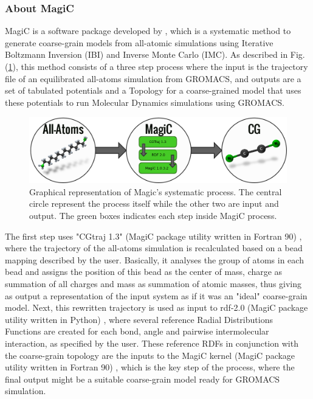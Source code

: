 \documentclass[10pt,a4paper,twoside]{article}
\begin{document}
\subsubsection{About MagiC}
\label{subsubsec:magic}
MagiC is a software package developed by , which is a systematic method to generate coarse-grain models from all-atomic simulations using Iterative Boltzmann Inversion (IBI) and Inverse Monte Carlo (IMC). As described in Fig.(\ref{Fig:magic}), this method consists of a three step process where the input is the trajectory file of an equilibrated all-atoms simulation from GROMACS, and outputs are a set of tabulated potentials and a Topology for a coarse-grained model that uses these potentials to run Molecular Dynamics simulations using GROMACS. 
 \begin{figure}[ht]
  \begin{center}
	\includegraphics[width=1 \textwidth]{./images/magic}
	\caption{Graphical representation of Magic's systematic process. The central circle represent the process itself while the other two are input and output. The green boxes indicates each step inside MagiC process. }
	\label{Fig:magic}
	\end{center}
	\end{figure}

 The first step uses "CGtraj 1.3" (MagiC package utility written in Fortran 90) \cite{magicmanu}, where the trajectory of the all-atoms simulation is recalculated based on a bead mapping described by the user. Basically, it analyses the group of atoms in each bead and assigns the position of this bead as the center of mass, charge as summation of all charges and mass as summation of atomic masses, thus giving as output a representation of the input system as if it was an "ideal" coarse-grain model. Next, this rewritten trajectory is used as input to rdf-2.0  (MagiC package utility written in Python) \cite{magicmanu}, where several reference Radial Distributions Functions are created for each bond, angle and pairwise intermolecular interaction, as specified by the user. These reference RDFs in conjunction with the coarse-grain topology are the  inputs to the MagiC kernel (MagiC package utility written in Fortran 90) \cite{magicmanu}, which is the key step of the process, where the final output might be a suitable coarse-grain model ready for GROMACS simulation.
 
\end{document}
